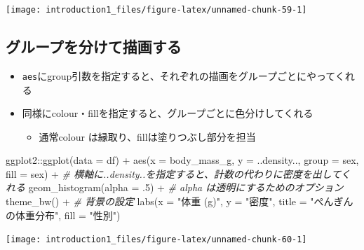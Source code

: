 \documentclass[
]{ltjsarticle}
\newenvironment{Shaded}{\begin{snugshade}}{\end{snugshade}}
\newcommand{\AttributeTok}[1]{\textcolor[rgb]{0.77,0.63,0.00}{#1}}
\newcommand{\CommentTok}[1]{\textcolor[rgb]{0.56,0.35,0.01}{\textit{#1}}}
\newcommand{\DecValTok}[1]{\textcolor[rgb]{0.00,0.00,0.81}{#1}}
\newcommand{\FunctionTok}[1]{\textcolor[rgb]{0.00,0.00,0.00}{#1}}
\newcommand{\NormalTok}[1]{#1}
\newcommand{\SpecialCharTok}[1]{\textcolor[rgb]{0.00,0.00,0.00}{#1}}
\newcommand{\StringTok}[1]{\textcolor[rgb]{0.31,0.60,0.02}{#1}}
\providecommand{\tightlist}{%
  \setlength{\itemsep}{0pt}\setlength{\parskip}{0pt}}
\begin{document}
\begin{center}\texttt{[image: introduction1\_files/figure-latex/unnamed-chunk-59-1]} \end{center}

\hypertarget{ux30b0ux30ebux30fcux30d7ux3092ux5206ux3051ux3066ux63cfux753bux3059ux308b}{%
\subsection{グループを分けて描画する}\label{ux30b0ux30ebux30fcux30d7ux3092ux5206ux3051ux3066ux63cfux753bux3059ux308b}}

\begin{itemize}
\tightlist
\item
  \texttt{aes}にgroup引数を指定すると、それぞれの描画をグループごとにやってくれる
\item
  同様にcolour・fillを指定すると、グループごとに色分けしてくれる

  \begin{itemize}
  \tightlist
  \item
    通常colour は縁取り、fillは塗りつぶし部分を担当
  \end{itemize}
\end{itemize}

\begin{Shaded}
\begin{Highlighting}[]
\NormalTok{ggplot2}\SpecialCharTok{::}\FunctionTok{ggplot}\NormalTok{(}\AttributeTok{data =}\NormalTok{ df) }\SpecialCharTok{+}
  \FunctionTok{aes}\NormalTok{(}\AttributeTok{x =}\NormalTok{ body\_mass\_g, }\AttributeTok{y =}\NormalTok{ ..density.., }\AttributeTok{group =}\NormalTok{ sex, }\AttributeTok{fill =}\NormalTok{ sex) }\SpecialCharTok{+} 
  \CommentTok{\# 横軸に..density..を指定すると、計数の代わりに密度を出してくれる}
  \FunctionTok{geom\_histogram}\NormalTok{(}\AttributeTok{alpha =}\NormalTok{ .}\DecValTok{5}\NormalTok{) }\SpecialCharTok{+} \CommentTok{\# alpha は透明にするためのオプション}
  \FunctionTok{theme\_bw}\NormalTok{() }\SpecialCharTok{+} \CommentTok{\# 背景の設定}
  \FunctionTok{labs}\NormalTok{(}\AttributeTok{x =} \StringTok{"体重 (g)"}\NormalTok{, }\AttributeTok{y =} \StringTok{"密度"}\NormalTok{, }\AttributeTok{title =} \StringTok{"ぺんぎんの体重分布"}\NormalTok{, }\AttributeTok{fill =} \StringTok{"性別"}\NormalTok{)}
\end{Highlighting}
\end{Shaded}

\begin{center}\texttt{[image: introduction1\_files/figure-latex/unnamed-chunk-60-1]} \end{center}
\end{document}
